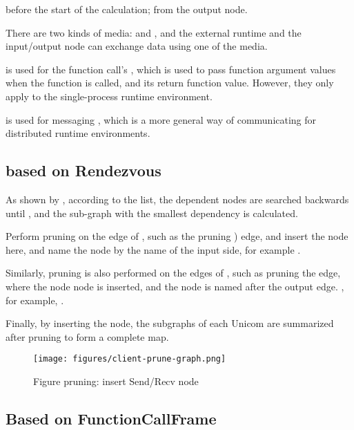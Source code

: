 \begin{content}
\begin{enum}
   before the start of the  calculation;
   from the output node.
\end{enum}

There are two kinds of media:  and , and the external runtime and the input/output node can exchange data using one of the media.

 is used for the  function call's , which is used to pass function argument values ​​when the function is called, and its return function value. However, they only apply to the single-process runtime environment.

 is used for  messaging , which is a more general way of communicating for distributed runtime environments.

\subsection{based on Rendezvous}

As shown by , according to the  list, the dependent nodes are searched backwards until , and the sub-graph with the smallest dependency is calculated.

Perform pruning on the edge of , such as the pruning ) edge, and insert the node  here, and name the node by the name of the input side, for example .

Similarly, pruning is also performed on the edges of , such as pruning the  edge, where the node  node is inserted, and the node is named after the output edge. , for example, .

Finally, by inserting the  node, the subgraphs of each Unicom are summarized after pruning to form a complete  map.

\begin{figure}[H]
\centering
\texttt{[image: figures/client-prune-graph.png]}
\caption{Figure pruning: insert Send/Recv node}
 \label{fig:client-prune-graph}
\end{figure}

\subsection{Based on FunctionCallFrame}


\end{content}
